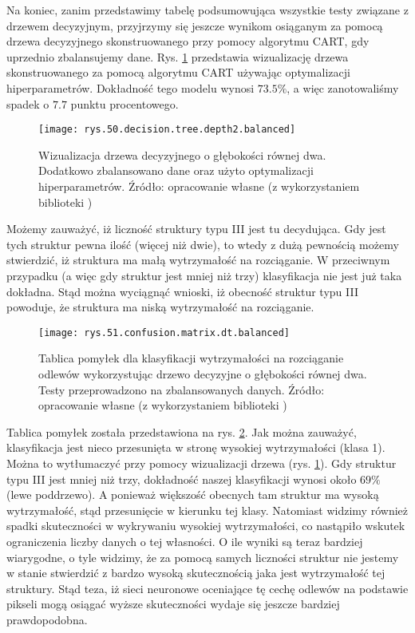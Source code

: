 Na koniec, zanim przedstawimy tabelę podsumowująca wszystkie testy związane z drzewem decyzyjnym, przyjrzymy się jeszcze wynikom osiąganym za pomocą drzewa decyzyjnego skonstruowanego przy pomocy algorytmu CART, gdy uprzednio zbalansujemy dane. 
Rys. \ref{rys.50.decision.tree.depth2.balanced} przedstawia wizualizację drzewa skonstruowanego za pomocą algorytmu CART używając optymalizacji hiperparametrów. Dokładność tego modelu wynosi $73.5\%$, a więc zanotowaliśmy spadek o $7.7$ punktu procentowego. 
\begin{figure}[h]
    \centering
    \texttt{[image: rys.50.decision.tree.depth2.balanced]}
    \caption{Wizualizacja drzewa decyzyjnego o głębokości równej dwa. Dodatkowo zbalansowano dane oraz użyto optymalizacji hiperparametrów. Źródło: opracowanie własne (z wykorzystaniem biblioteki )}
    \label{rys.50.decision.tree.depth2.balanced}
\end{figure}
Możemy zauważyć, iż liczność struktury typu III jest tu decydująca. Gdy jest tych struktur pewna ilość (więcej niż dwie), to wtedy z dużą pewnością możemy stwierdzić, iż struktura ma małą wytrzymałość na rozciąganie. W przeciwnym przypadku (a więc gdy struktur jest mniej niż trzy) klasyfikacja nie jest już taka dokładna. Stąd można wyciągnąć wnioski, iż obecność struktur typu III powoduje, że struktura ma niską wytrzymałość na rozciąganie.
\begin{figure}[h]
    \centering
    \texttt{[image: rys.51.confusion.matrix.dt.balanced]}
    \caption{Tablica pomyłek dla klasyfikacji wytrzymałości na rozciąganie odlewów wykorzystując drzewo decyzyjne o głębokości równej dwa. Testy przeprowadzono na zbalansowanych danych. Źródło: opracowanie własne (z wykorzystaniem biblioteki )}
    \label{rys.51.confusion.matrix.dt.balanced}
\end{figure}
Tablica pomyłek została przedstawiona na rys. \ref{rys.51.confusion.matrix.dt.balanced}. Jak można zauważyć, klasyfikacja jest nieco przesunięta w stronę wysokiej wytrzymałości (klasa 1). Można to wytłumaczyć przy pomocy wizualizacji drzewa (rys. \ref{rys.50.decision.tree.depth2.balanced}). Gdy struktur typu III jest mniej niż trzy, dokładność naszej klasyfikacji wynosi około $69\%$ (lewe poddrzewo). A ponieważ większość obecnych tam struktur ma wysoką wytrzymałość, stąd przesunięcie w kierunku tej klasy. Natomiast widzimy również spadki skuteczności w wykrywaniu wysokiej wytrzymałości, co nastąpiło wskutek ograniczenia liczby danych o tej własności. O ile wyniki są teraz bardziej wiarygodne, o tyle widzimy, że za pomocą samych liczności struktur nie jestemy w stanie stwierdzić z bardzo wysoką skutecznością jaka jest wytrzymałość tej struktury. Stąd teza, iż sieci neuronowe oceniające tę cechę odlewów na podstawie pikseli mogą osiągać wyższe skuteczności wydaje się jeszcze bardziej prawdopodobna. 

